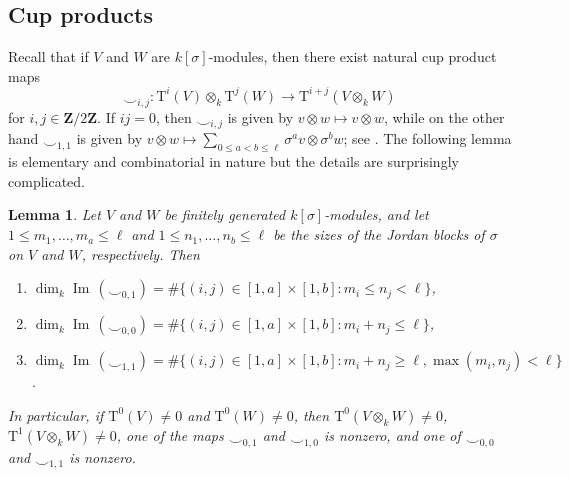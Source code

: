 \documentclass[reqno]{amsart}
\numberwithin{equation}{subsection}
\newcommand{\Z}{\mathbf{Z}}
\newcommand{\co}{\colon}
\DeclareMathOperator{\Ima}{Im\,}
\newcommand{\rT}{\ensuremath{\mathrm{T}}\xspace}
\newtheorem{lemma}[thm]{Lemma}
\theoremstyle{remark}
\numberwithin{equation}{subsection}
\numberwithin{figure}{subsection}
\begin{document}
\subsection{Cup products}

Recall that if $V$ and $W$ are $k[\sigma]$-modules, then there exist natural cup product maps 
\[
\smile_{i,j}\co\rT^i(V) \otimes_k \rT^j(W) \to \rT^{i+j}(V \otimes_k W)
\]
for $i, j \in \Z/2\Z$. If $ij = 0$, then $\smile_{i,j}$ is given by $v \otimes w \mapsto v \otimes w$, while on the other hand $\smile_{1,1}$ is given by $v \otimes w \mapsto \sum_{0 \leq a < b \leq \ell} \sigma^av \otimes \sigma^bw$; see \cite[XII.7, page 252]{CE56}. The following lemma is elementary and combinatorial in nature but the details are surprisingly complicated.

\begin{lemma}\label{lemma:first-tate-cohom-tensor}
Let $V$ and $W$ be finitely generated $k[\sigma]$-modules, and let $1 \leq m_1, \dots, m_a \leq \ell$ and $1 \leq n_1, \dots, n_b \leq \ell$ be the sizes of the Jordan blocks of $\sigma$ on $V$ and $W$, respectively. Then
\begin{enumerate}
    \item $\dim_k \Ima(\smile_{0,1}) = \#\{(i, j) \in [1,a] \times [1,b]\co m_i \leq n_j < \ell\}$,
    \item $\dim_k \Ima(\smile_{0,0}) = \#\{(i, j) \in [1,a] \times [1,b]\co m_i + n_j \leq \ell\}$,
    \item $\dim_k \Ima(\smile_{1,1}) = \#\{(i, j) \in [1,a] \times [1,b]\co m_i + n_j \geq \ell, \max(m_i, n_j) < \ell\}$.
\end{enumerate}
In particular, if $\rT^0(V) \neq 0$ and $\rT^0(W) \neq 0$, then $\rT^0(V \otimes_k W) \neq 0$, $\rT^1(V \otimes_k W) \neq 0$, one of the maps $\smile_{0,1}$ and $\smile_{1,0}$ is nonzero, and one of $\smile_{0,0}$ and $\smile_{1,1}$ is nonzero.
\end{lemma}
\end{document}
